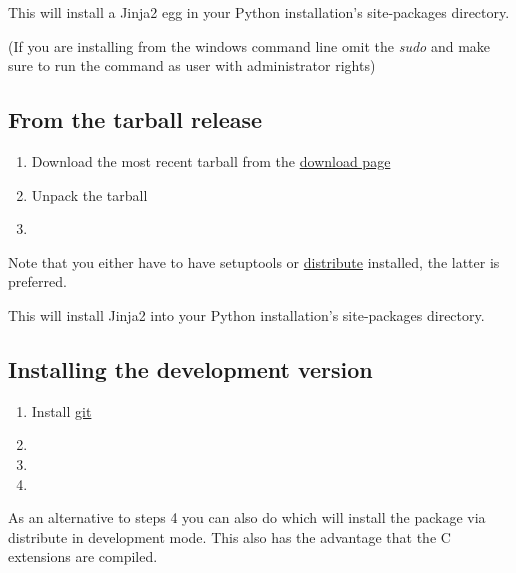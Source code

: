 \documentclass[a4paper,10pt,english]{sphinxmanual}
\begin{document}
This will install a Jinja2 egg in your Python installation's site-packages
directory.

(If you are installing from the windows command line omit the \emph{sudo} and make
sure to run the command as user with administrator rights)


\subsection{From the tarball release}
\label{intro:from-the-tarball-release}\begin{enumerate}
\item {} 
Download the most recent tarball from the \href{http://pypi.python.org/pypi/Jinja2}{download page}

\item {} 
Unpack the tarball

\item {} 

\end{enumerate}

Note that you either have to have setuptools or \href{http://pypi.python.org/pypi/distribute}{distribute} installed,
the latter is preferred.

This will install Jinja2 into your Python installation's site-packages directory.


\subsection{Installing the development version}
\label{intro:installing-the-development-version}\label{intro:distribute}\begin{enumerate}
\item {} 
Install \href{http://git-scm.org/}{git}

\item {} 

\item {} 

\item {} 

\end{enumerate}

As an alternative to steps 4 you can also do 
which will install the package via distribute in development mode.  This also
has the advantage that the C extensions are compiled.
\end{document}
